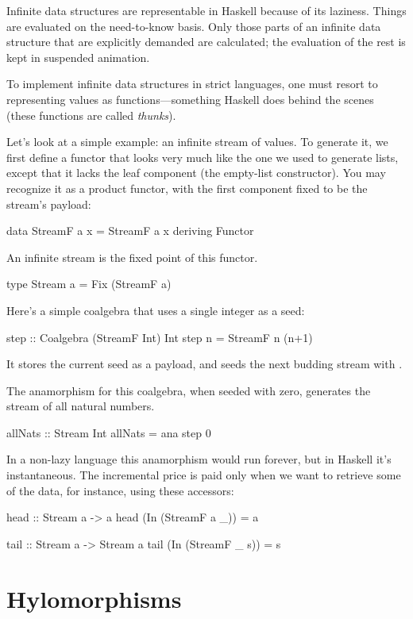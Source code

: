 \documentclass[DaoFP]{subfiles}
\begin{document}
Infinite data structures are representable in Haskell because of its laziness. Things are evaluated on the need-to-know basis. Only those parts of an infinite data structure that are explicitly demanded are calculated; the evaluation of the rest is kept in suspended animation. 

To implement infinite data structures in strict languages, one must resort to representing values as functions---something Haskell does behind the scenes (these functions are called \emph{thunks}).

Let's look at a simple example: an infinite stream of values. To generate it, we first define a functor that looks very much like the one we used to generate lists, except that it lacks the leaf component (the empty-list constructor). You may recognize it as a product functor, with the first component fixed to be the stream's payload:
\begin{haskell}
data StreamF a x = StreamF a x
  deriving Functor
\end{haskell}
An infinite stream is the fixed point of this functor.
\begin{haskell}
type Stream a = Fix (StreamF a)
\end{haskell}
Here's a simple coalgebra that uses a single integer  as a seed:
\begin{haskell}
step :: Coalgebra (StreamF Int) Int
step n = StreamF n (n+1)
\end{haskell}
It stores the current seed as a payload, and seeds the next budding stream with . 

The anamorphism for this coalgebra, when seeded with zero, generates the stream of all natural numbers.
\begin{haskell}
allNats :: Stream Int
allNats = ana step 0
\end{haskell}
In a non-lazy language this anamorphism would run forever, but in Haskell it's instantaneous. The incremental price is paid only when we want to retrieve some of the data, for instance, using these accessors:
\begin{haskell}
head :: Stream a -> a
head (In (StreamF a _)) = a

tail :: Stream a -> Stream a
tail (In (StreamF _ s)) = s
\end{haskell}


\section{Hylomorphisms}
\end{document}
